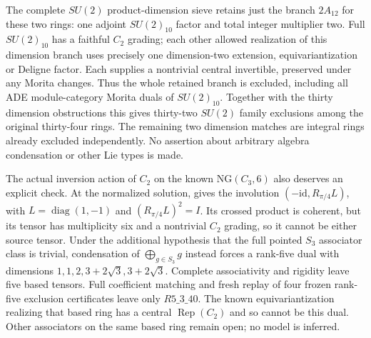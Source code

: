 The complete $SU(2)$ product-dimension sieve retains just the branch
$2A_{12}$ for these two rings: one adjoint $SU(2)_{10}$ factor and total
integer multiplier two. Full $SU(2)_{10}$ has a faithful $C_2$ grading;
each other allowed realization of this dimension branch uses precisely
one dimension-two extension, equivariantization or Deligne factor.
Each supplies a nontrivial central invertible, preserved under any
Morita changes. Thus the whole retained branch is excluded, including
all ADE module-category Morita duals of $SU(2)_{10}$. Together with the
thirty dimension obstructions this gives thirty-two $SU(2)$ family
exclusions among the original thirty-four rings. The remaining two
dimension matches are integral rings already excluded independently.
No assertion about arbitrary algebra condensation or other Lie types
is made.

The actual inversion action of $C_2$ on the known
$\mathrm{NG}(C_3,6)$ also deserves an explicit check. At the normalized
solution, \cite[Lemma~13.1 and Example~13.10]{IzumiNear} gives the
involution $(-\mathrm{id},R_{\pi/4}L)$, with $L=\operatorname{diag}(1,-1)$
and $(R_{\pi/4}L)^2=I$. Its crossed product is coherent, but its tensor
has multiplicity six and a nontrivial $C_2$ grading, so it cannot be
either source tensor. Under the additional hypothesis that the full
pointed $S_3$ associator class is trivial, condensation of
$\bigoplus_{g\in S_3}g$ instead forces a rank-five dual with dimensions
$1,1,2,3+2\sqrt3,3+2\sqrt3$. Complete associativity and rigidity leave
five based tensors. Full coefficient matching and fresh replay of four
frozen rank-five exclusion certificates leave only $R5\_3\_40$.
The known equivariantization realizing that based ring has a central
$\operatorname{Rep}(C_2)$ and so cannot be this dual. Other associators
on the same based ring remain open; no model is inferred.

